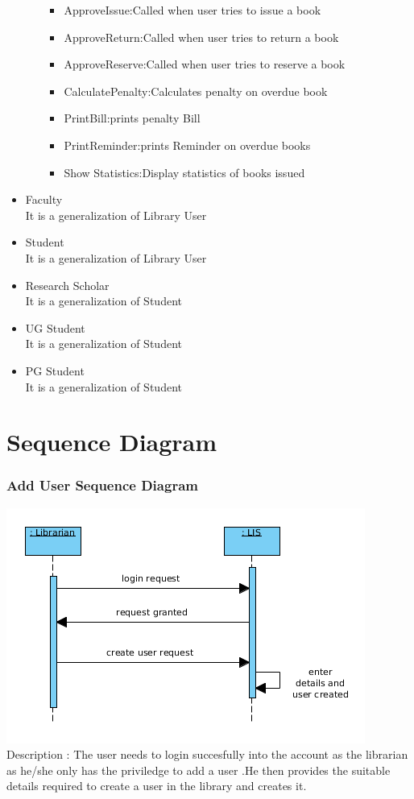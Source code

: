 \documentclass{article}
\begin{document}
\begin{itemize}
\begin{itemize}
\begin{itemize}
\item ApproveIssue:Called when user tries to issue a book
\item ApproveReturn:Called when user tries to return a book

\item ApproveReserve:Called when user tries to reserve a book
\item CalculatePenalty:Calculates penalty on overdue book
\item PrintBill:prints penalty Bill
\item PrintReminder:prints Reminder on overdue books
\item Show Statistics:Display statistics of books issued

\end{itemize}
\end{itemize}

\item Faculty\\
It is a generalization of Library User
\item Student\\
It is a generalization of Library User
\item Research Scholar\\
It is a generalization of Student
\item UG Student\\
It is a generalization of Student
\item PG Student\\
It is a generalization of Student

\end{itemize}

\section{Sequence Diagram}
\subsubsection*{Add User Sequence Diagram}
\includegraphics[scale=0.50]{images/seqDiagAddUser.png}
\\
Description : The user needs to login succesfully into the account as the librarian as he/she only has the priviledge to add a user .He then provides the suitable details required to create a user in the library and creates it.
\\
\end{document}
